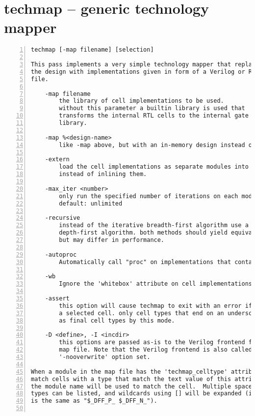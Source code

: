 \section{techmap -- generic technology mapper}
\label{cmd:techmap}
\begin{lstlisting}[numbers=left,frame=single]
    techmap [-map filename] [selection]

This pass implements a very simple technology mapper that replaces cells in
the design with implementations given in form of a Verilog or RTLIL source
file.

    -map filename
        the library of cell implementations to be used.
        without this parameter a builtin library is used that
        transforms the internal RTL cells to the internal gate
        library.

    -map %<design-name>
        like -map above, but with an in-memory design instead of a file.

    -extern
        load the cell implementations as separate modules into the design
        instead of inlining them.

    -max_iter <number>
        only run the specified number of iterations on each module.
        default: unlimited

    -recursive
        instead of the iterative breadth-first algorithm use a recursive
        depth-first algorithm. both methods should yield equivalent results,
        but may differ in performance.

    -autoproc
        Automatically call "proc" on implementations that contain processes.

    -wb
        Ignore the 'whitebox' attribute on cell implementations.

    -assert
        this option will cause techmap to exit with an error if it can't map
        a selected cell. only cell types that end on an underscore are accepted
        as final cell types by this mode.

    -D <define>, -I <incdir>
        this options are passed as-is to the Verilog frontend for loading the
        map file. Note that the Verilog frontend is also called with the
        '-nooverwrite' option set.

When a module in the map file has the 'techmap_celltype' attribute set, it will
match cells with a type that match the text value of this attribute. Otherwise
the module name will be used to match the cell.  Multiple space-separated cell
types can be listed, and wildcards using [] will be expanded (ie. "$_DFF_[PN]_"
is the same as "$_DFF_P_ $_DFF_N_").


\end{lstlisting}
